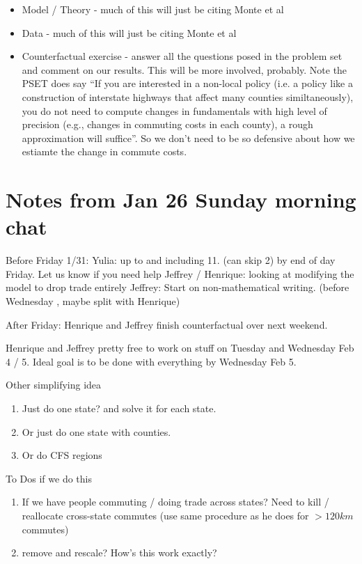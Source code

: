 \documentclass{article}
\begin{document}
\begin{enumerate}
\begin{itemize}
    \item Model / Theory - much of this will just be citing Monte et al
    \item Data   - much of this will just be citing Monte et al
    \item Counterfactual exercise - answer all the questions posed in the problem set and comment on our results. This will be more involved, probably. Note the PSET does say ``If you are interested in a non-local policy (i.e. a policy like a construction of interstate highways that affect many counties similtaneously), you do not need to compute changes in fundamentals with high level of precision (e.g., changes in commuting costs in each county), a rough approximation will suffice''. So we don't need to be so defensive about how we estiamte the change in commute costs.
    \end{itemize}
\end{enumerate}


\section{Notes from Jan 26 Sunday morning chat}
Before Friday 1/31: 
Yulia: up to and including 11. (can skip 2) by end of day Friday. Let us know if you need help
Jeffrey / Henrique: looking at modifying the model to drop trade entirely
Jeffrey: Start on non-mathematical writing. (before Wednesday , maybe split with Henrique)

After Friday:
Henrique and Jeffrey finish counterfactual over next weekend. 


Henrique and Jeffrey pretty free to work on stuff on Tuesday and Wednesday Feb 4 / 5.
Ideal goal is to be done with everything by Wednesday Feb 5. 


Other simplifying idea

\begin{enumerate}
\item Just do one state? and solve it for each state. 
\item Or just do one state with counties.
\item Or do CFS regions
\end{enumerate}

To Dos if we do this
\begin{enumerate}
\item If we have people commuting / doing trade across states?  Need to kill / reallocate cross-state commutes (use same procedure as he does for $>120km$ commutes)
\item remove and rescale? How's this work exactly? 

\end{enumerate}
\end{document}
